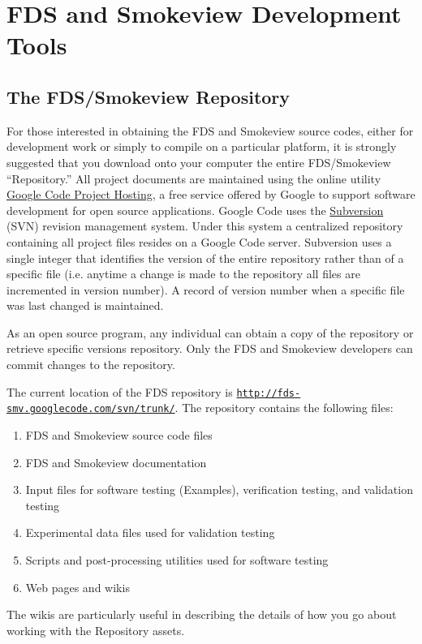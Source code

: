 \documentclass[11pt]{book}
\newcommand{\ct}{\tt\small}
\begin{document}
\part{FDS and Smokeview Development Tools}

\chapter{The FDS/Smokeview Repository}

For those interested in obtaining the FDS and Smokeview source codes, either for development work or simply to compile on a particular platform,
it is strongly suggested that you download onto your computer the entire FDS/Smokeview ``Repository.''
All project documents are maintained using the online utility \href{http://code.google.com/opensource}{{Google Code Project Hosting}}, a free service offered
by Google to support software development for open source applications.  Google Code uses the \href{http://subversion.tigris.org}{{Subversion}} (SVN) revision management system.
Under this system a centralized repository containing all project files resides on a Google Code server.  Subversion uses a single integer that
identifies the version of the entire repository rather than of a specific file (i.e. anytime a change is made to the repository all files are incremented in version number).
A record of version number when a specific file was last changed is maintained.

As an open source program, any individual can obtain a copy of the repository or retrieve specific versions
repository.  Only the FDS and Smokeview developers can commit changes to the repository.

The current location of the FDS repository is \href{http://code.google.com/p/fds-smv/source/checkout}
{{\ct http://fds-smv.googlecode.com/svn/trunk/}}. The repository contains the following files:
\begin{enumerate}
\item FDS and Smokeview source code files
\item FDS and Smokeview documentation
\item Input files for software testing (Examples), verification testing, and validation testing
\item Experimental data files used for validation testing
\item Scripts and post-processing utilities used for software testing
\item Web pages and wikis
\end{enumerate}
The wikis are particularly useful in describing the details of how you go about working with the Repository assets.
\end{document}
